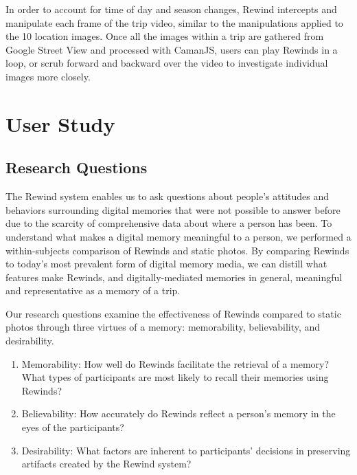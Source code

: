\documentclass{sigchi}
\begin{document}
In order to account for time of day and season changes,
Rewind intercepts and manipulate each frame of the trip video, similar to the manipulations applied to the 10 location images. Once all the images within a trip are gathered from Google Street View and processed with CamanJS, users can play Rewinds in a loop, or scrub forward and backward over the video to investigate individual images more closely.

\section{User Study}
\subsection{Research Questions}
The Rewind system enables us to ask questions about people's attitudes and behaviors surrounding digital memories that were not possible to answer before due to the scarcity of comprehensive data about where a person has been. To understand what makes a digital memory meaningful to a person, we performed a within-subjects comparison of Rewinds and static photos. By comparing Rewinds to today's most prevalent form of digital memory media, we can distill what features make Rewinds, and digitally-mediated memories in general, meaningful and representative as a memory of a trip.

Our research questions examine the effectiveness of Rewinds compared to static photos through three virtues of a memory: memorability, believability, and desirability. %

\begin{enumerate}
\item Memorability: How well do Rewinds facilitate the retrieval of a memory? What types of participants are most likely to recall their memories using Rewinds?
\item Believability:  How accurately do Rewinds reflect a person's memory in the eyes of the participants? 
\item Desirability: What factors are inherent to participants' decisions in preserving artifacts created by the Rewind system?
\end{enumerate}
\end{document}
